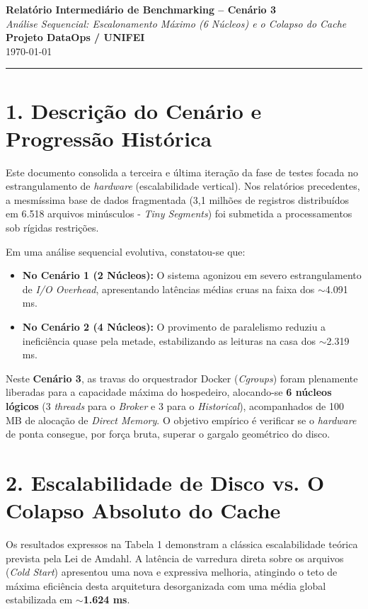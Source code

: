 \documentclass[12pt, a4paper]{article}
\begin{document}
\begin{center}
    \Large\textbf{Relatório Intermediário de Benchmarking -- Cenário 3} \\[0.2cm]
    \large\textit{Análise Sequencial: Escalonamento Máximo (6 Núcleos) e o Colapso do Cache} \\[0.5cm]
    \normalsize\textbf{Projeto DataOps / UNIFEI} \\
    \small{\today}
\end{center}

\vspace{0.5cm}
\noindent\rule{\textwidth}{1pt}

\section*{1. Descrição do Cenário e Progressão Histórica}
Este documento consolida a terceira e última iteração da fase de testes focada no estrangulamento de \textit{hardware} (escalabilidade vertical). Nos relatórios precedentes, a mesmíssima base de dados fragmentada (3,1 milhões de registros distribuídos em 6.518 arquivos minúsculos - \textit{Tiny Segments}) foi submetida a processamentos sob rígidas restrições.

Em uma análise sequencial evolutiva, constatou-se que:
\begin{itemize}
    \item \textbf{No Cenário 1 (2 Núcleos):} O sistema agonizou em severo estrangulamento de \textit{I/O Overhead}, apresentando latências médias cruas na faixa dos $\sim$4.091 ms.
    \item \textbf{No Cenário 2 (4 Núcleos):} O provimento de paralelismo reduziu a ineficiência quase pela metade, estabilizando as leituras na casa dos $\sim$2.319 ms.
\end{itemize}

Neste \textbf{Cenário 3}, as travas do orquestrador Docker (\textit{Cgroups}) foram plenamente liberadas para a capacidade máxima do hospedeiro, alocando-se \textbf{6 núcleos lógicos} (3 \textit{threads} para o \textit{Broker} e 3 para o \textit{Historical}), acompanhados de 100 MB de alocação de \textit{Direct Memory}. O objetivo empírico é verificar se o \textit{hardware} de ponta consegue, por força bruta, superar o gargalo geométrico do disco.

\section*{2. Escalabilidade de Disco vs. O Colapso Absoluto do Cache}
Os resultados expressos na Tabela 1 demonstram a clássica escalabilidade teórica prevista pela Lei de Amdahl. A latência de varredura direta sobre os arquivos (\textit{Cold Start}) apresentou uma nova e expressiva melhoria, atingindo o teto de máxima eficiência desta arquitetura desorganizada com uma média global estabilizada em \textbf{$\sim$1.624 ms}.
\end{document}

